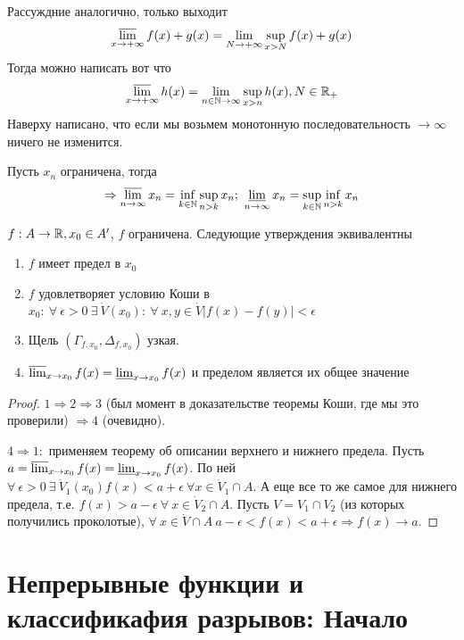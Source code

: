 \documentclass[12pt]{report}
\begin{document}
\begin{note}[О верхнем пределе суммы, когда $x_0 = +\infty$]
Рассуждние аналогично, только выходит
$$\varlimsup_{x \to +\infty}{f(x) + g(x)} = \lim_{N \to +\infty}{\sup_{x > N}{f(x) + g(x)}}$$
Тогда можно написать вот что
$$\varlimsup_{x \to +\infty}{h(x)} = \lim_{n \in \mathbb{N} \to \infty}{\sup_{x > n}{h(x)}}, N \in \mathbb{R}_+$$
Наверху написано, что если мы возьмем монотонную последовательность $\to \infty$ ничего не изменится. 

Пусть $x_n$ ограничена, тогда
$$\Rightarrow \varlimsup_{n \to \infty}{x_n} = \inf_{k \in \mathbb{N}}{\sup_{n > k}{x_n}}; ~\varliminf_{n \to \infty}{x_n} = \sup_{k \in \mathbb{N}}{\inf_{n > k}{x_n}}$$
\end{note}

\begin{thm}
$f: A \to \mathbb{R}, x_0 \in A'$, $f$ ограничена. Следующие утверждения эквивалентны
\begin{enumerate}
\item $f$ имеет предел в $x_0$
\item $f$ удовлетворяет условию Коши в $x_0: ~\forall ~\epsilon > 0 ~\exists ~\dot V(x_0): ~\forall ~x, y \in \dot V |f(x) - f(y)| < \epsilon$
\item Щель $(\Gamma_{f, x_0}, \Delta_{f, x_0})$ узкая.
\item $\varlimsup_{x \to x_0}{f(x)} = \varliminf_{x \to x_0}{f(x)}$ и пределом является их общее значение
\end{enumerate}
\end{thm}
\begin{proof}
$1 \Rightarrow 2 \Rightarrow 3$ (был момент в доказательстве теоремы Коши, где мы это проверили) $\Rightarrow 4$ (очевидно). 

$4 \Rightarrow 1:$ применяем теорему об описании верхнего и нижнего предела. Пусть $a = \varlimsup_{x \to x_0}{f(x)} = \varliminf_{x \to x_0}{f(x)}$. По ней $\forall ~\epsilon > 0 ~\exists ~\dot V_1(x_0) f(x) < a + \epsilon ~\forall x \in \dot V_1 \cap A$. А еще все то же самое для нижнего предела, т.е. $f(x) > a - \epsilon ~\forall ~x \in\dot  V_2 \cap A$. Пусть $V = V_1 \cap V_2$ (из которых получились проколотые), $\forall ~x \in \dot V \cap A ~a - \epsilon < f(x) < a + \epsilon \Rightarrow f(x) \to a$.
\end{proof}

\chapter{Непрерывные функции и классификафия разрывов: Начало}
\end{document}
